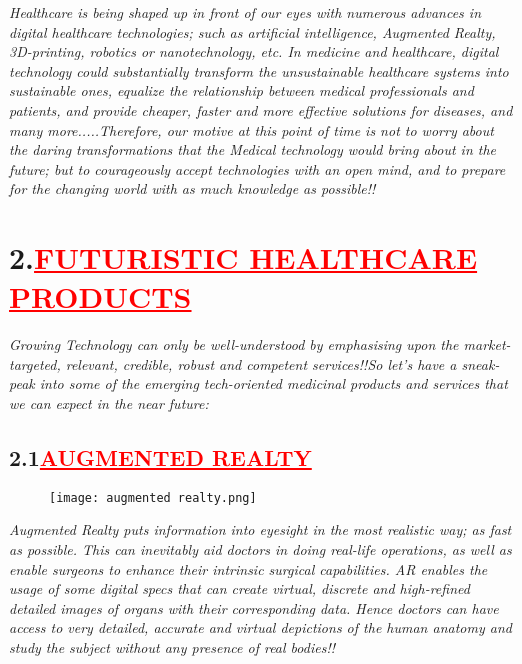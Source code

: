 \documentclass[12pt]{article}
\begin{document}
\hspace{1cm}\large{\emph{Healthcare is being shaped up in front of our eyes with numerous advances in digital healthcare technologies; such as artificial intelligence, Augmented Realty, 3D-printing, robotics or nanotechnology, etc. In medicine and healthcare, digital technology could substantially transform the unsustainable healthcare systems into sustainable ones, equalize the relationship between medical professionals and patients, and provide cheaper, faster and more effective solutions for diseases, and many more.....Therefore, our motive at this point of time is not to worry about the daring transformations that the Medical technology would bring about in the future; but to courageously accept technologies with an open mind, and to prepare for the changing world with as much knowledge as possible!!}}
\section*{\textbf{2.\hspace{1cm}\textcolor{red}{\underline{\Large{FUTURISTIC HEALTHCARE PRODUCTS}}}}}
\hspace{1cm}\large{\emph{Growing Technology can only be well-understood by emphasising upon the market-targeted, relevant, credible, robust and competent services!!So let's have a sneak-peak into some of the emerging tech-oriented medicinal products and services that we can expect in the near future:}}
\subsection*{\textbf{\hspace{1cm}2.1\hspace{1cm}\textcolor{red}{\underline{\large{AUGMENTED REALTY}}}}}
\begin{figure}
    \centering
    \texttt{[image: augmented realty.png]}
\end{figure}
\hspace{1cm}\large{\emph{Augmented Realty puts information into eyesight in the most realistic way; as fast as possible. This can inevitably aid doctors in doing real-life operations, as well as enable surgeons to enhance their intrinsic surgical capabilities. AR enables the usage of some digital specs that can create virtual, discrete and high-refined detailed images of organs with their corresponding data. Hence doctors can have access to very detailed, accurate and virtual depictions of the human anatomy and study the subject without any presence of real bodies!!}}
\end{document}
